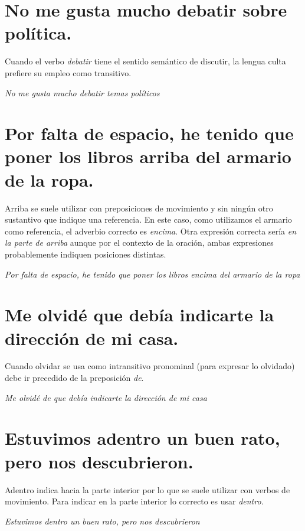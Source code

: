 \documentclass[12pt, a4paper, oneside]{report}
\begin{document}
        \section{No me gusta mucho debatir \color{rojo}sobre política\color{negro}.}
            Cuando el verbo \emph{debatir} tiene el sentido semántico de discutir, la lengua culta prefiere
            su empleo como transitivo.
            \begin{center}
                \textit{No me gusta mucho debatir \color{verde}temas políticos\color{negro}}
            \end{center}

        \section{Por falta de espacio, he tenido que poner los libros \color{rojo}arriba\color{negro} \;del
        armario de la ropa.}
        Arriba se suele utilizar con preposiciones de movimiento y sin ningún otro sustantivo que indique una
        referencia. En este caso, como utilizamos el armario como referencia, el adverbio correcto es
        \emph{encima}. Otra expresión correcta sería \emph{en la parte de arriba} aunque por el contexto de la
        oración, ambas expresiones probablemente indiquen posiciones distintas.
        \begin{center}
            \textit{Por falta de espacio, he tenido que poner los libros \color{verde}encima\color{negro}
            \;del armario de la ropa}
        \end{center}
        \clearpage

        \setcounter{chapter}{4}
        \setcounter{section}{0}

        \section{Me olvidé \color{rojo}que\color{negro} \;debía indicarte la dirección de mi casa.}
        Cuando olvidar se usa como intransitivo pronominal (para expresar lo olvidado) debe ir precedido de la
        preposición \emph{de}.
        \begin{center}
            \textit{Me olvidé \color{verde}de que\color{negro} \;debía indicarte la dirección de mi casa}
        \end{center}

        \section{Estuvimos \color{rojo}adentro\color{negro} \;un buen rato, pero nos descubrieron.}
        Adentro indica hacia la parte interior por lo que se suele utilizar con verbos de movimiento. Para
        indicar en la parte interior lo correcto es usar \emph{dentro}.
        \begin{center}
            \textit{Estuvimos \color{verde}dentro\color{negro} \;un buen rato, pero nos descubrieron}
        \end{center}
\end{document}

